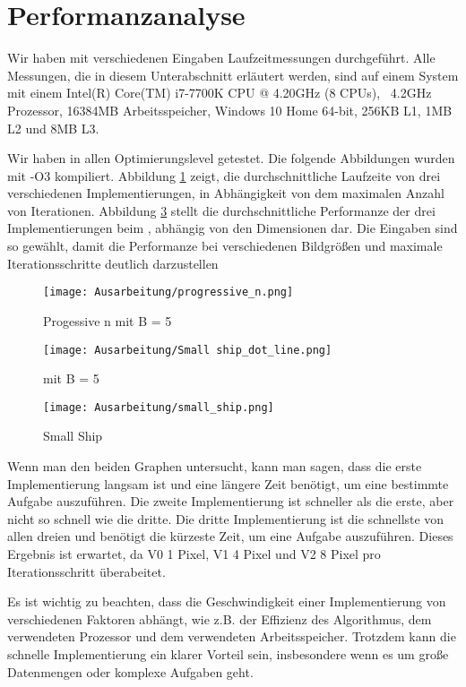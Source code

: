 \documentclass[course=erap]{aspdoc}
\begin{document}
\section{Performanzanalyse}
Wir haben mit verschiedenen Eingaben Laufzeitmessungen durchgeführt. Alle Messungen, die in diesem Unterabschnitt erläutert werden, sind auf einem System mit einem Intel(R) Core(TM) i7-7700K CPU @ 4.20GHz (8 CPUs), ~4.2GHz Prozessor, 16384MB Arbeitsspeicher, Windows 10 Home 64-bit, 256KB L1, 1MB L2 und 8MB L3.

Wir haben in allen Optimierungslevel getestet. Die folgende Abbildungen wurden mit -O3 kompiliert. Abbildung \ref{fig:progressive_n} zeigt, die durchschnittliche Laufzeite von drei verschiedenen Implementierungen, in Abhängigkeit von dem maximalen Anzahl von Iterationen. Abbildung \ref{fig:small_ship} stellt die durchschnittliche Performanze der drei Implementierungen beim , abhängig von den Dimensionen dar. Die Eingaben sind so gewählt, damit die Performanze bei verschiedenen Bildgrößen und maximale Iterationsschritte deutlich darzustellen
\begin{figure}[htp]
    \centering
    \texttt{[image: Ausarbeitung/progressive\_n.png]}
    \caption{Progessive n mit B = 5}
    \label{fig:progressive_n}
\end{figure}

\begin{figure}[htp]
    \centering
    \texttt{[image: Ausarbeitung/Small ship\_dot\_line.png]}
    \caption{ mit B = 5}
    \label{fig:small_ship_graph}
\end{figure}

\begin{figure}[htp]
    \centering
    \texttt{[image: Ausarbeitung/small\_ship.png]}
    \caption{Small Ship}
    \label{fig:small_ship}
\end{figure}

Wenn man den beiden Graphen untersucht, kann man sagen, dass die erste Implementierung langsam ist und eine längere Zeit benötigt, um eine bestimmte Aufgabe auszuführen. Die zweite Implementierung ist schneller als die erste, aber nicht so schnell wie die dritte. Die dritte Implementierung ist die schnellste von allen dreien und benötigt die kürzeste Zeit, um eine Aufgabe auszuführen. Dieses Ergebnis ist erwartet, da V0 1 Pixel, V1 4 Pixel und V2 8 Pixel pro Iterationsschritt überabeitet.

Es ist wichtig zu beachten, dass die Geschwindigkeit einer Implementierung von verschiedenen Faktoren abhängt, wie z.B. der Effizienz des Algorithmus, dem verwendeten Prozessor und dem verwendeten Arbeitsspeicher. Trotzdem kann die schnelle Implementierung ein klarer Vorteil sein, insbesondere wenn es um große Datenmengen oder komplexe Aufgaben geht.
\end{document}
